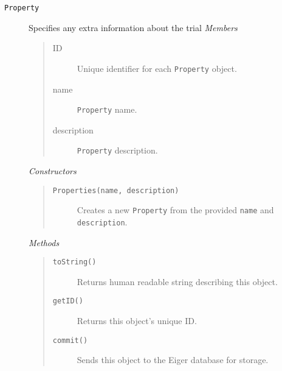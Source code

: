 \begin{description}
\item[\texttt{Property}] Specifies any extra information about the trial
  {\em Members}
	\begin{quote}
	\begin{description}
    \item[ID] Unique identifier for each \texttt{Property} object.
    \item[name] \texttt{Property} name.
    \item[description] \texttt{Property} description.
	\end{description}
	\end{quote}
  {\em Constructors}
	\begin{quote}
	\begin{description}
    \item[\texttt{Properties(name, description)}] Creates a new \texttt{Property} from the provided \texttt{name} and \texttt{description}.
	\end{description}
	\end{quote}
	{\em Methods}
	\begin{quote}
	\begin{description}
		\item[\texttt{toString()}] Returns human readable string describing this object.
		\item[\texttt{getID()}] Returns this object's unique ID.
	\item[\texttt{commit()}] Sends this object to the Eiger database for storage.
	\end{description}
	\end{quote}


\end{description}
